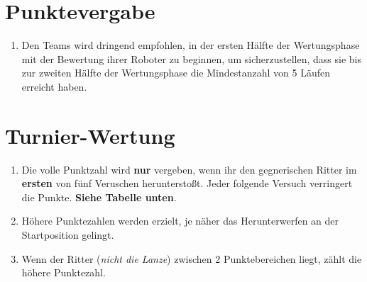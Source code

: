 \documentclass[a4paper,12pt]{article}
\begin{document}
\section{Punktevergabe}
\begin{enumerate}
	\item Den Teams wird dringend empfohlen, in der ersten Hälfte der
		Wertungsphase mit der Bewertung ihrer Roboter zu beginnen, um
		sicherzustellen, dass sie bis zur zweiten Hälfte der
		Wertungsphase die Mindestanzahl von 5 Läufen erreicht haben.
\end{enumerate}

\section{Turnier-Wertung}
\begin{enumerate}
	\item Die volle Punktzahl wird \textbf{nur} vergeben, wenn ihr den
		gegnerischen Ritter im \textbf{ersten} von fünf Veruschen
		herunterstoßt. Jeder folgende Versuch verringert die Punkte.
		\textbf{Siehe Tabelle unten}.
	\item Höhere Punktezahlen werden erzielt, je näher das Herunterwerfen
		an der Startposition gelingt.
	\item Wenn der Ritter (\emph{nicht die Lanze}) zwischen 2
		Punktebereichen liegt, zählt die höhere Punktezahl.
\end{enumerate}

\pagebreak
\end{document}
